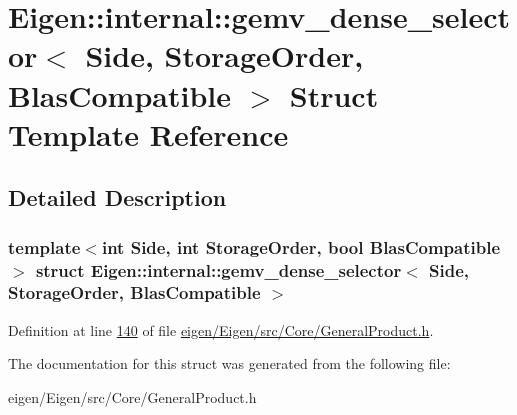 \hypertarget{struct_eigen_1_1internal_1_1gemv__dense__selector}{}\section{Eigen\+:\+:internal\+:\+:gemv\+\_\+dense\+\_\+selector$<$ Side, Storage\+Order, Blas\+Compatible $>$ Struct Template Reference}
\label{struct_eigen_1_1internal_1_1gemv__dense__selector}


\subsection{Detailed Description}
\subsubsection*{template$<$int Side, int Storage\+Order, bool Blas\+Compatible$>$\newline
struct Eigen\+::internal\+::gemv\+\_\+dense\+\_\+selector$<$ Side, Storage\+Order, Blas\+Compatible $>$}



Definition at line \hyperlink{eigen_2_eigen_2src_2_core_2_general_product_8h_source_l00140}{140} of file \hyperlink{eigen_2_eigen_2src_2_core_2_general_product_8h_source}{eigen/\+Eigen/src/\+Core/\+General\+Product.\+h}.



The documentation for this struct was generated from the following file\+:\begin{DoxyCompactItemize}
\item 
eigen/\+Eigen/src/\+Core/\+General\+Product.\+h\end{DoxyCompactItemize}
